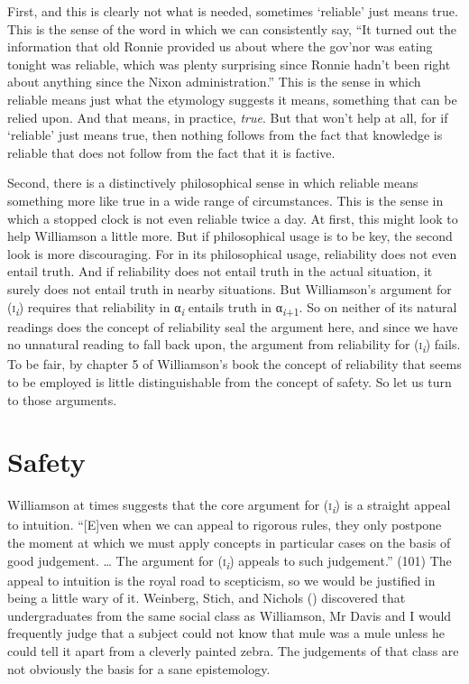 \documentclass[
  10pt,
  letterpaper,
  DIV=11,
  numbers=noendperiod,
  twoside]{scrartcl}
\begin{document}
First, and this is clearly not what is needed, sometimes `reliable' just
means true. This is the sense of the word in which we can consistently
say, ``It turned out the information that old Ronnie provided us about
where the gov'nor was eating tonight was reliable, which was plenty
surprising since Ronnie hadn't been right about anything since the Nixon
administration.'' This is the sense in which reliable means just what
the etymology suggests it means, something that can be relied upon. And
that means, in practice, \emph{true}. But that won't help at all, for if
`reliable' just means true, then nothing follows from the fact that
knowledge is reliable that does not follow from the fact that it is
factive.

Second, there is a distinctively philosophical sense in which reliable
means something more like true in a wide range of circumstances. This is
the sense in which a stopped clock is not even reliable twice a day. At
first, this might look to help Williamson a little more. But if
philosophical usage is to be key, the second look is more discouraging.
For in its philosophical usage, reliability does not even entail truth.
And if reliability does not entail truth in the actual situation, it
surely does not entail truth in nearby situations. But Williamson's
argument for (\textsc{i}\textsubscript{\emph{i}}) requires that
reliability in α\textsubscript{\emph{i}} entails truth in
α\textsubscript{\emph{i}+1}. So on neither of its natural readings does
the concept of reliability seal the argument here, and since we have no
unnatural reading to fall back upon, the argument from reliability for
(\textsc{i}\textsubscript{\emph{i}}) fails. To be fair, by chapter 5 of
Williamson's book the concept of reliability that seems to be employed
is little distinguishable from the concept of safety. So let us turn to
those arguments.

\section{Safety}\label{safety}

Williamson at times suggests that the core argument for
(\textsc{i}\textsubscript{\emph{i}}) is a straight appeal to intuition.
``{[}E{]}ven when we can appeal to rigorous rules, they only postpone
the moment at which we must apply concepts in particular cases on the
basis of good judgement. \ldots{} The argument for
(\textsc{i}\textsubscript{\emph{i}}) appeals to such judgement.'' (101)
The appeal to intuition is the royal road to scepticism, so we would be
justified in being a little wary of it. Weinberg, Stich, and Nichols
() discovered that undergraduates from
the same social class as Williamson, Mr Davis and I would frequently
judge that a subject could not know that mule was a mule unless he could
tell it apart from a cleverly painted zebra. The judgements of that
class are not obviously the basis for a sane epistemology.
\end{document}
